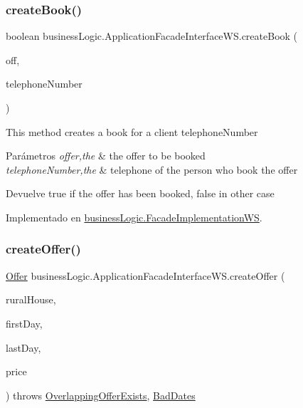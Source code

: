 \subsubsection{\texorpdfstring{createBook()}{createBook()}}
{\footnotesize\ttfamily boolean business\+Logic.\+Application\+Facade\+Interface\+W\+S.\+create\+Book (\begin{DoxyParamCaption}\item[{\mbox{\hyperlink{classdomain_1_1_offer}{Offer}}}]{off,  }\item[{String}]{telephone\+Number }\end{DoxyParamCaption})}

This method creates a book for a client telephone\+Number


\begin{DoxyParams}{Parámetros}
{\em offer,the} & the offer to be booked \\
\hline
{\em telephone\+Number,the} & telephone of the person who book the offer \\
\hline
\end{DoxyParams}
\begin{DoxyReturn}{Devuelve}
true if the offer has been booked, false in other case 
\end{DoxyReturn}


Implementado en \mbox{\hyperlink{classbusiness_logic_1_1_facade_implementation_w_s_a89aa08f9fe033c295d7fcf0cb5571882}{business\+Logic.\+Facade\+Implementation\+WS}}.

\mbox{\label{interfacebusiness_logic_1_1_application_facade_interface_w_s_a0e8d2135ef1384a32e74f60bcea55f09}} 
\subsubsection{\texorpdfstring{createOffer()}{createOffer()}}
{\footnotesize\ttfamily \mbox{\hyperlink{classdomain_1_1_offer}{Offer}} business\+Logic.\+Application\+Facade\+Interface\+W\+S.\+create\+Offer (\begin{DoxyParamCaption}\item[{\mbox{\hyperlink{classdomain_1_1_rural_house}{Rural\+House}}}]{rural\+House,  }\item[{Date}]{first\+Day,  }\item[{Date}]{last\+Day,  }\item[{float}]{price }\end{DoxyParamCaption}) throws \mbox{\hyperlink{classexceptions_1_1_overlapping_offer_exists}{Overlapping\+Offer\+Exists}}, \mbox{\hyperlink{classexceptions_1_1_bad_dates}{Bad\+Dates}}}

